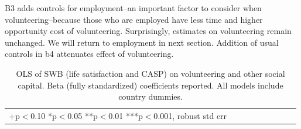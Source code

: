 \documentclass[10pt, letterpaper]{article}
\begin{document}
\begin{spacing}{1.4}


B3 adds  controls for employment--an important factor to consider when
volunteering--because those who are employed have less time and higher
opportunity cost of volunteering. Surprisingly, estimates on volunteering remain
unchanged. We will return to employment in next section.
Addition of usual controls in b4 attenuates effect of volunteering.
 




\begin{spacing}{.9}
\begin{table}[H]\centering \caption{OLS of SWB (life satisfaction and CASP) on volunteering
    and other social capital. Beta (fully standardized) coefficients reported. All models
    include country dummies.}  \begin{scriptsize} \begin{tabular}{p{1.8in}p{.5in}p{.5in}p{.5in}p{.5in}|p{.5in}p{.5in}p{.5in}p{.5in}p{.5in}p{.4in}p{.5in}p{.4in}}\hline 
      \hline\multicolumn{5}{l}{+p$<$0.10 *p$<$0.05 **p$<$0.01 ***p$<$0.001,
        robust std err} \end{tabular}\label{regB} \end{scriptsize}\end{table}
\end{spacing}



\end{spacing}
\end{document}
